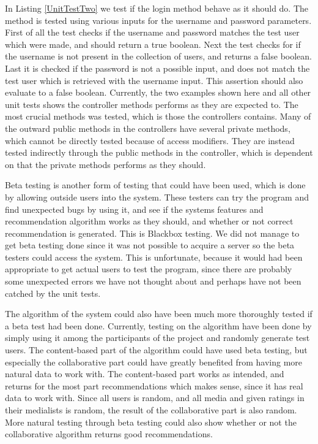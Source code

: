 In Listing \ref{UnitTestTwo} we test if the login method behave as it should do. The method is tested using various inputs for the username and password parameters. First of all the test checks if the username and password matches the test user which were made, and should return a true boolean. Next the test checks for if the username is not present in the collection of users, and returns a false boolean. Last it is checked if the password is not a possible input, and does not match the test user which is retrieved with the username input. This assertion should also evaluate to a false boolean. Currently, the two examples shown here and all other unit tests shows the controller methods performs as they are expected to. The most crucial methods was tested, which is those the controllers contains. Many of the outward public methods in the controllers have several private methods, which cannot be directly tested because of access modifiers. They are instead tested indirectly through the public methods in the controller, which is dependent on that the private methods performs as they should.

Beta testing is another form of testing that could have been used, which is done by allowing outside users into the system. These testers can try the program and find unexpected bugs by using it, and see if the systems features and recommendation algorithm works as they should, and whether or not correct recommendation is generated. This is Blackbox testing. We did not manage to get beta testing done since it was not possible to acquire a server so the beta testers could access the system. This is unfortunate, because it would had been appropriate to get actual users to test the program, since there are probably some unexpected errors we have not thought about and perhaps have not been catched by the unit tests.

The algorithm of the system could also have been much more thoroughly tested if a beta test had been done. Currently, testing on the algorithm have been done by simply using it among the participants of the project and randomly generate test users. The content-based part of the algorithm could have used beta testing, but especially the collaborative part could have greatly benefited from having more natural data to work with. The content-based part works as intended, and returns for the most part recommendations which makes sense, since it has real data to work with. Since all users is random, and all media and given ratings in their medialists is random, the result of the collaborative part is also random. More natural testing through beta testing could also show whether or not the collaborative algorithm returns good recommendations.